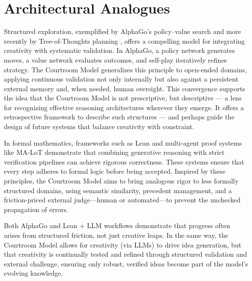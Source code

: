 \documentclass[11pt]{article}
\begin{document}
\section{Architectural Analogues}
\label{sec:analogues}
Structured exploration, exemplified by AlphaGo's policy–value search \citep{silver2016alphago} and more recently by Tree-of-Thoughts planning \citep{yao2023tree}, offers a compelling model for integrating creativity with systematic validation. In AlphaGo, a policy network generates moves, a value network evaluates outcomes, and self-play iteratively refines strategy. The Courtroom Model generalizes this principle to open-ended domains, applying continuous validation not only internally but also against a persistent external memory and, when needed, human oversight. This convergence supports the idea that the Courtroom Model is not prescriptive, but descriptive — a lens for recognizing effective reasoning architectures wherever they emerge. It offers a retrospective framework to describe such structures — and perhaps guide the design of future systems that balance creativity with constraint.

In formal mathematics, frameworks such as Lean \citep{mathlib2020lean} and multi-agent proof systems like MA-LoT \citep{wang2025malot} demonstrate that combining generative reasoning with strict verification pipelines can achieve rigorous correctness. These systems ensure that every step adheres to formal logic before being accepted. Inspired by these principles, the Courtroom Model aims to bring analogous rigor to less formally structured domains, using semantic similarity, precedent management, and a friction-priced external judge—human or automated—to prevent the unchecked propagation of errors.

Both AlphaGo and Lean + LLM workflows demonstrate that progress often arises from structured friction, not just creative leaps. In the same way, the Courtroom Model allows for creativity (via LLMs) to drive idea generation, but that creativity is continually tested and refined through structured validation and external challenge, ensuring only robust, verified ideas become part of the model's evolving knowledge.
\end{document}
